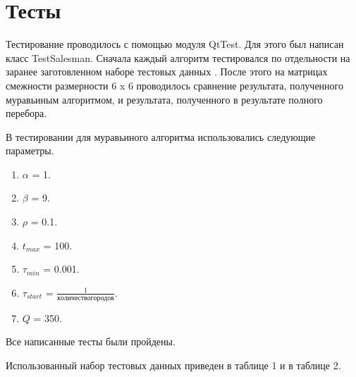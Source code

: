 \documentclass[a4paper,14pt]{report}
\begin{document}
\section*{Тесты}

Тестирование проводилось с помощью модуля QtTest. Для этого был написан класс TestSalesman. Сначала каждый алгоритм тестировался по отдельности на заранее заготовленном наборе тестовых данных .
После этого на матрицах смежности размерности 6 x 6 проводилось сравнение результата, полученного муравьиным алгоритмом, и результата, полученного в результате полного перебора.

В тестировании для муравьиного алгоритма использовались следующие параметры.

\begin{enumerate}
	\item $\alpha$ = 1.
	\item $\beta$ = 9.
	\item $\rho$ = 0.1.
	\item $t_{max}$ = 100.
	\item $\tau_{min}$ = 0.001.
	\item $\tau_{start}$ = $\frac{1}{количество городов}$.
	\item $Q$ = 350.
\end{enumerate}

Все написанные тесты были пройдены.

Использованный набор тестовых данных приведен в таблице 1 и в таблице 2.
\end{document}

